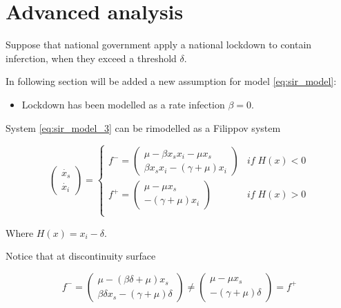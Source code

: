 \section{Advanced analysis}
Suppose that national government apply a national lockdown to contain inferction, when they exceed a threshold $\delta$.

In following section will be added a new assumption for model \ref{eq:sir_model}:

\begin{itemize}
    \item Lockdown has been modelled as a rate infection $\beta = 0$.
\end{itemize}

System \ref{eq:sir_model_3} can be rimodelled as a Filippov system

\begin{equation}
    \label{eq:sir_model_pws_1}
    \begin{pmatrix} \dot{x_s} \\ \dot{x_i} \end{pmatrix} =
    \begin{cases}
        f^- =
        \begin{pmatrix} \mu - \beta x_sx_i - \mu x_s \\ \beta x_sx_i - (\gamma + \mu)x_i \end{pmatrix}
        & if\;H(x) < 0 \\
        f^+ =
        \begin{pmatrix} \mu - \mu x_s \\ - (\gamma + \mu)x_i \end{pmatrix}
        & if\;H(x) > 0 \\
    \end{cases}
\end{equation}

Where $H(x) = x_i - \delta$.

Notice that at discontinuity surface

\begin{equation}
    f^- = \begin{pmatrix} \mu - \left(\beta\delta + \mu\right) x_s \\ \beta\delta x_s - (\gamma + \mu)\delta \end{pmatrix} \neq \begin{pmatrix} \mu - \mu x_s \\ - (\gamma + \mu)\delta \end{pmatrix} = f^+
\end{equation}

